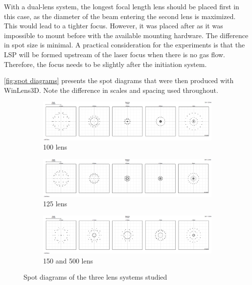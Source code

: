             With a dual-lens system, the longest focal length lens should be placed first in this case, as the diameter of the beam entering the second lens is maximized. This would lead to a tighter focus. However, it was placed after as it was impossible to mount before with the available mounting hardware. The difference in spot size is minimal. A practical consideration for the experiments is that the LSP will be formed upstream of the laser focus when there is no gas flow. Therefore, the focus needs to be slightly after the initiation system.

            \autoref{fig:spot diagrams} presents the spot diagrams that were then produced with WinLens3D. Note the difference in scales and spacing used throughout.
            \begin{figure}[!ht]
                \centering
                \begin{subfigure}[t]{\textwidth}
                    \centering
                    \includegraphics[width=\textwidth]{assets/3 design/100 lens spot diagram.png}
                    \caption{100 lens}
                \end{subfigure}
                \begin{subfigure}[t]{\textwidth}
                    \centering
                    \includegraphics[width=\textwidth]{assets/3 design/125 lens spot diagram.png}
                    \caption{125 lens}
                \end{subfigure}
                \begin{subfigure}[t]{\textwidth}
                    \centering
                    \includegraphics[width=\textwidth]{assets/3 design/500 and 150 lenses spot size.png}
                    \caption{150 and 500 lens}
                \end{subfigure}
                \caption{Spot diagrams of the three lens systems studied}
                \label{fig:spot diagrams}
            \end{figure}

